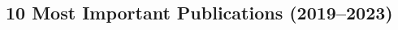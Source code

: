\documentclass[a4paper,8pt]{article} %
\begin{document}
\begin{thebibliography}{100}
	
%
\section{10 Most Important Publications (2019--2023)}%
\vspace{.2cm}








%
%


\end{thebibliography}
\end{document}
